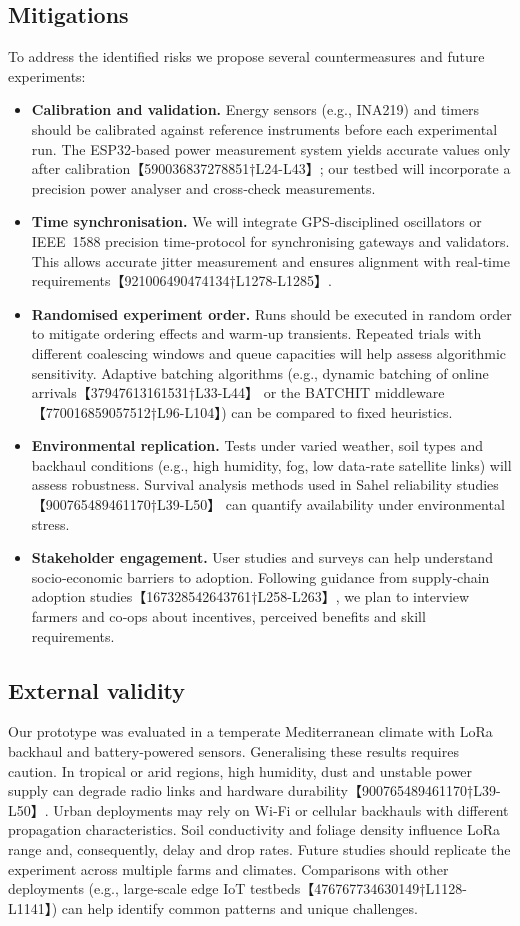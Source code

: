 \subsection{Mitigations}
To address the identified risks we propose several countermeasures and future experiments:
\begin{itemize}
  \item \textbf{Calibration and validation.}  Energy sensors (e.g., INA219) and timers should be calibrated against reference instruments before each experimental run.  The ESP32‑based power measurement system yields accurate values only after calibration【590036837278851†L24-L43】; our testbed will incorporate a precision power analyser and cross‑check measurements.
  \item \textbf{Time synchronisation.}  We will integrate GPS‑disciplined oscillators or IEEE~1588 precision time‑protocol for synchronising gateways and validators.  This allows accurate jitter measurement and ensures alignment with real‑time requirements【921006490474134†L1278-L1285】.
  \item \textbf{Randomised experiment order.}  Runs should be executed in random order to mitigate ordering effects and warm‑up transients.  Repeated trials with different coalescing windows and queue capacities will help assess algorithmic sensitivity.  Adaptive batching algorithms (e.g., dynamic batching of online arrivals【37947613161531†L33-L44】 or the BATCHIT middleware【770016859057512†L96-L104】) can be compared to fixed heuristics.
  \item \textbf{Environmental replication.}  Tests under varied weather, soil types and backhaul conditions (e.g., high humidity, fog, low data‑rate satellite links) will assess robustness.  Survival analysis methods used in Sahel reliability studies【900765489461170†L39-L50】 can quantify availability under environmental stress.
  \item \textbf{Stakeholder engagement.}  User studies and surveys can help understand socio‑economic barriers to adoption.  Following guidance from supply‑chain adoption studies【167328542643761†L258-L263】, we plan to interview farmers and co‑ops about incentives, perceived benefits and skill requirements.
\end{itemize}

\subsection{External validity}
Our prototype was evaluated in a temperate Mediterranean climate with LoRa backhaul and battery‑powered sensors.  Generalising these results requires caution.  In tropical or arid regions, high humidity, dust and unstable power supply can degrade radio links and hardware durability【900765489461170†L39-L50】.  Urban deployments may rely on Wi‑Fi or cellular backhauls with different propagation characteristics.  Soil conductivity and foliage density influence LoRa range and, consequently, delay and drop rates.  Future studies should replicate the experiment across multiple farms and climates.  Comparisons with other deployments (e.g., large‑scale edge IoT testbeds【476767734630149†L1128-L1141】) can help identify common patterns and unique challenges.

